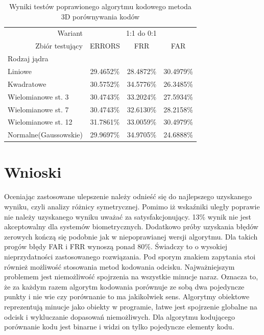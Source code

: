 \begin{table}[!htb]
    \begin{tabular}{p{3cm}|r||c|c|c|}
	\cline{2-5}
    & Wariant & \multicolumn{3}{|c|}{1:1 do 0:1}\\ \cline{2-5} 
    & Zbiór testujący & ERRORS  & FRR & FAR\\ \hline
	\multicolumn{2}{|l||}{Rodzaj jądra} &  \multicolumn{3}{|c|}{}\\
	\hline\hline
    \multicolumn{2}{|l||}{Liniowe} & 29.4652\% & 28.4872\% & 30.4979\%\\ \hline
    \multicolumn{2}{|l||}{Kwadratowe} & 30.5752\% & 34.5776\% & 26.3485\%\\ \hline
    \multicolumn{2}{|l||}{Wielomianowe st. 3} & 30.4743\% & 33.2024\% & 27.5934\%\\ \hline
    \multicolumn{2}{|l||}{Wielomianowe st. 7} & 30.4743\% & 32.6130\% & 28.2158\%\\ \hline
    \multicolumn{2}{|l||}{Wielomianowe st. 12} & 31.7861\% & 33.0059\% & 30.4979\%\\ \hline
    \multicolumn{2}{|l||}{Normalne(Gaussowskie)} & 29.9697\% & 34.9705\% & 24.6888\%\\ \hline
    \end{tabular}
	\caption{Wyniki testów poprawionego algorytmu kodowego metoda 3D porównywania kodów}
	\label{tab:3D_sum_23}
\end{table}


\vspace{5cm}\par
\section{Wnioski}
Oceniając zastosowane ulepszenie należy odnieść się do najlepszego uzyskanego wyniku, czyli analizy różnicy symetrycznej. Pomimo iż wskaźniki uległy poprawie nie należy uzyskanego wyniku uważać za satysfakcjonujący. 13\% wynik nie jest akceptowalny dla systemów biometrycznych. Dodatkowo próby uzyskania błędów zerowych kończą się podobnie jak w niepoprawianej wersji algorytmu. Dla takich progów błędy FAR i FRR wynoszą ponad 80\%. Świadczy to o wysokiej nieprzydatności zastosowanego rozwiązania. Pod sporym znakiem zapytania stoi również możliwość stosowania metod kodowania odcisku. Najważniejszym problemem jest niemożliwość spojrzenia na wszystkie minucje naraz. Oznacza to, że za każdym razem algorytm kodowania porównuje ze sobą dwa pojedyncze punkty i nie wie czy porównanie to ma jakikolwiek sens. Algorytmy obiektowe reprezentują minucje jako obiekty w programie, łatwe jest spojrzenie globalne na odcisk i wykluczanie dopasowań niemożliwych. Dla algorytmu kodującego porównanie kodu jest binarne i widzi on tylko pojedyncze elementy kodu.